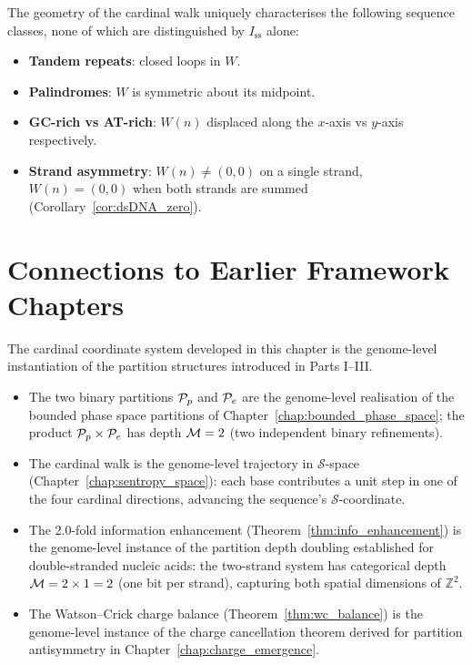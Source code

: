 \begin{proposition}
\label{prop:walk_classification}
The geometry of the cardinal walk uniquely characterises the following
sequence classes, none of which are distinguished by $I_{\mathrm{ss}}$ alone:
\begin{itemize}
  \item \textbf{Tandem repeats}: closed loops in $W$.
  \item \textbf{Palindromes}: $W$ is symmetric about its midpoint.
  \item \textbf{GC-rich vs AT-rich}: $W(n)$ displaced along the $x$-axis
    vs $y$-axis respectively.
  \item \textbf{Strand asymmetry}: $W(n) \neq (0,0)$ on a single strand,
    $W(n) = (0,0)$ when both strands are summed
    (Corollary~\ref{cor:dsDNA_zero}).
\end{itemize}
\end{proposition}

\section{Connections to Earlier Framework Chapters}
\label{sec:ch14_connections}

The cardinal coordinate system developed in this chapter is the
genome-level instantiation of the partition structures introduced in
Parts I--III.

\begin{itemize}
  \item The two binary partitions $\mathcal{P}_p$ and $\mathcal{P}_e$ are the
    genome-level realisation of the bounded phase space partitions of
    Chapter~\ref{chap:bounded_phase_space}; the product $\mathcal{P}_p \times \mathcal{P}_e$
    has depth $\mathcal{M} = 2$ (two independent binary refinements).
  \item The cardinal walk is the genome-level trajectory in
    $\mathcal{S}$-space (Chapter~\ref{chap:sentropy_space}): each base
    contributes a unit step in one of the four cardinal directions,
    advancing the sequence's $\mathcal{S}$-coordinate.
  \item The 2.0-fold information enhancement (Theorem~\ref{thm:info_enhancement})
    is the genome-level instance of the partition depth doubling
    established for double-stranded nucleic acids: the two-strand system
    has categorical depth $\mathcal{M} = 2 \times 1 = 2$ (one bit per strand),
    capturing both spatial dimensions of $\mathbb{Z}^2$.
  \item The Watson--Crick charge balance (Theorem~\ref{thm:wc_balance})
    is the genome-level instance of the charge cancellation theorem
    derived for partition antisymmetry in Chapter~\ref{chap:charge_emergence}.
\end{itemize}

